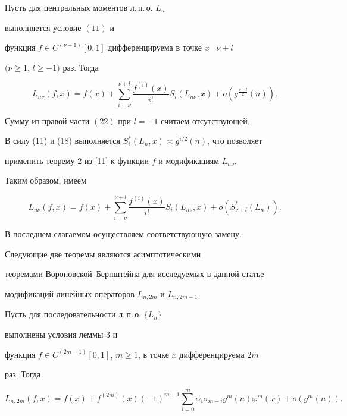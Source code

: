 \begin{lem} 


Пусть для центральных моментов л.\,п.\,о. $L_n$ 


выполняется условие $(11)$ и 


функция $f\in C^{(\nu-1)}[0,1]$ дифференцируема в точке $x$ \ $\nu+l$ 


$(\nu\ge1$, $l\ge-1)$ раз. Тогда 


\begin{equation} 


L_{n\nu}(f,x)=f(x)+\sum^{\nu+l}_{i=\nu} 


\frac{f^{(i)}(x)}{i!}S_i(L_{n\nu},x)+o(g^{\frac{\nu+l}{2}}(n)). 


\end{equation} 


Сумму из правой части $(22)$ при $l=-1$ считаем отсутствующей. 


\end{lem} 


 


\begin{pf} 


В силу (11) и (18) выполняется $S^*_i(L_n,x)\asymp g^{i/2}(n)$, что позволяет 


применить теорему 2 из [11] к функции $f$ и модификациям $L_{n\nu}$. 


Таким образом, имеем 


$$ 


L_{n\nu}(f,x)=f(x)+\sum^{\nu+l}_{i=\nu}\frac{f^{(i)}(x)}{i!} 


S_i(L_{n\nu},x)+o(S^*_{\nu+l}(L_n)). 


$$ 


В последнем слагаемом осуществляем соответствующую замену. 


\end{pf} 


 


 


Следующие две теоремы являются асимптотическими 


теоремами Вороновской--Бернштейна для исследуемых в данной статье 


модификаций линейных операторов $L_{n,2m}$ и $L_{n,2m-1}$. 


 


\begin{thm} 


Пусть для последовательности л.\,п.\,о. $\{L_n\}$ 


выполнены условия леммы $3$ и 


функция $f\in C^{(2m-1)}[0,1]$, $m\ge1$, в точке $x$ дифференцируема $2m$ 


раз. Тогда 


$$ 


L_{n,2m}(f,x)=f(x)+f^{(2m)}(x)(-1)^{m+1}\sum^m_{i=0} 


\alpha_i\sigma_{m-i}g^m(n)\varphi^m(x)+o(g^m(n)). 


$$ 


\end{thm} 


